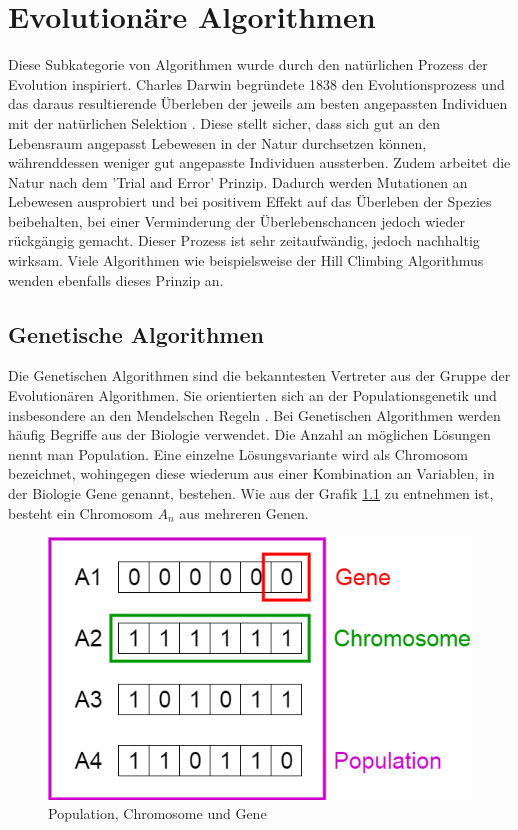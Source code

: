 \chapter{Evolutionäre Algorithmen}

Diese Subkategorie von Algorithmen wurde durch den natürlichen Prozess der Evolution
inspiriert. Charles Darwin begründete 1838 den Evolutionsprozess und das daraus resultierende
Überleben der jeweils am besten angepassten Individuen mit der natürlichen Selektion \cite{Wiki02}.
Diese stellt sicher, dass sich gut an den Lebensraum angepasst Lebewesen in der Natur
durchsetzen können, währenddessen weniger gut angepasste Individuen aussterben. Zudem
arbeitet die Natur nach dem 'Trial and Error' Prinzip. Dadurch werden Mutationen an
Lebewesen ausprobiert und bei positivem Effekt auf das Überleben der Spezies beibehalten,
bei einer Verminderung der Überlebenschancen jedoch wieder rückgängig gemacht. Dieser Prozess
ist sehr zeitaufwändig, jedoch nachhaltig wirksam. Viele Algorithmen wie beispielsweise
der Hill Climbing Algorithmus \cite{Anr18} wenden ebenfalls dieses Prinzip an.

\section{Genetische Algorithmen}

Die Genetischen Algorithmen sind die bekanntesten Vertreter aus der Gruppe der Evolutionären
Algorithmen. Sie orientierten sich an der Populationsgenetik und insbesondere an den Mendelschen
Regeln \cite{Mcc00}.
Bei Genetischen Algorithmen werden häufig Begriffe aus der Biologie verwendet. Die Anzahl an
möglichen Lösungen nennt man Population. Eine einzelne Lösungsvariante wird als Chromosom
bezeichnet, wohingegen diese wiederum aus einer Kombination an Variablen, in der Biologie Gene
genannt, bestehen. Wie aus der Grafik \ref{fig:genetics} zu entnehmen ist, besteht ein Chromosom
$A_n$ aus mehreren Genen.
\\
\begin{figure}[h!]
  \centering
  \includegraphics[scale=0.5]{resources/genetic_algorithms.png}
  \caption{Population, Chromosome und Gene \cite{Mal17}}
  \label{fig:genetics}
\end{figure}

